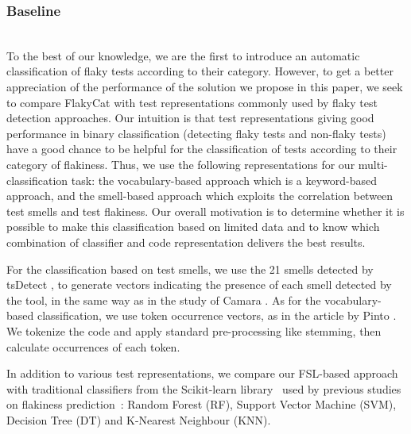 \subsubsection{Baseline}
~~ \\
To the best of our knowledge, we are the first to introduce an automatic classification of flaky tests according to their category.
However, to get a better appreciation of the performance of the solution we propose in this paper, we seek to compare FlakyCat with test representations commonly used by flaky test detection approaches. Our intuition is that test representations giving good performance in binary classification (\ie detecting flaky tests and non-flaky tests) have a good chance to be helpful for the classification of tests according to their category of flakiness. Thus, we use the following representations for our multi-classification task: the vocabulary-based approach \cite{pinto2020vocabulary} which is a keyword-based approach, and the smell-based approach \cite{camara2021use} which exploits the correlation between test smells and test flakiness. Our overall motivation is to determine whether it is possible to make this classification based on limited data and to know which combination of classifier and code representation delivers the best results. 

For the classification based on test smells, we use the 21 smells detected by tsDetect \cite{tsdetect}, to generate vectors indicating the presence of each smell detected by the tool, in the same way as in the study of Camara \etal \cite{camara2021use}. As for the vocabulary-based classification, we use token occurrence vectors, as in the article by Pinto \etal \cite{pinto2020vocabulary}. We tokenize the code and apply standard pre-processing like stemming, then calculate occurrences of each token.

In addition to various test representations, we compare our FSL-based approach with traditional classifiers from the Scikit-learn library~\cite{pedregosa2011scikit} used by previous studies on flakiness prediction~\cite{pinto2020vocabulary,camara2021use,Camara2021VocabExtendedReplication}: Random Forest (RF), Support Vector Machine (SVM), Decision Tree (DT) and K-Nearest Neighbour (KNN). 





